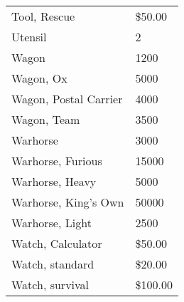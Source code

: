 \documentclass[twoside]{book}
\begin{document}
\begin{longtable}{p{1.25in}l}
  \raggedright
           Tool, Rescue 
  &
   \$50.00 
  \tabularnewline
      
  \raggedright
           Utensil 
  &
   2 
  \tabularnewline
      
  \raggedright
           Wagon 
  &
   1200 
  \tabularnewline
      
  \raggedright
           Wagon, Ox 
  &
   5000 
  \tabularnewline
      
  \raggedright
           Wagon, Postal Carrier 
  &
   4000 
  \tabularnewline
      
  \raggedright
           Wagon, Team 
  &
   3500 
  \tabularnewline
      
  \raggedright
           Warhorse 
  &
   3000 
  \tabularnewline
      
  \raggedright
           Warhorse, Furious 
  &
   15000 
  \tabularnewline
      
  \raggedright
           Warhorse, Heavy 
  &
   5000 
  \tabularnewline
      
  \raggedright
           Warhorse, King's Own
           
  &
   50000 
  \tabularnewline
      
  \raggedright
           Warhorse, Light 
  &
   2500 
  \tabularnewline
      
  \raggedright
           Watch, Calculator 
  &
   \$50.00 
  \tabularnewline
      
  \raggedright
           Watch, standard 
  &
   \$20.00 
  \tabularnewline
      
  \raggedright
           Watch, survival 
  &
   \$100.00 
  \tabularnewline
      
\end{longtable}
    
\end{document}
